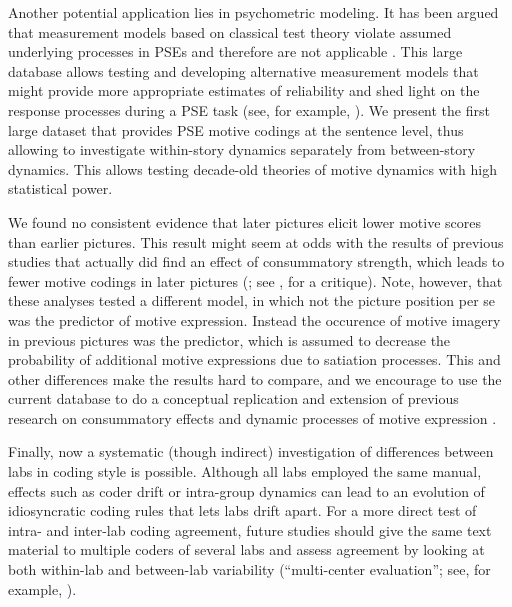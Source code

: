 \documentclass[jou,a4paper]{apa6}\usepackage[]{graphicx}\usepackage[]{color}
\begin{document}
Another potential application lies in psychometric modeling. It has been argued that measurement models based on classical test theory violate assumed underlying processes in PSEs and therefore are not applicable \parencite{atkinson_studying_1981,hibbard_critique_2003,schultheiss_reliability_2008}. This large database allows testing and developing alternative measurement models that might provide more appropriate estimates of reliability and shed light on the response processes during a PSE task (see, for example, ). We present the first large dataset that provides PSE motive codings at the sentence level, thus allowing to investigate within-story dynamics separately from between-story dynamics. This allows testing decade-old theories of motive dynamics with high statistical power. 

We found no consistent evidence that later pictures elicit lower motive scores than earlier pictures. This result might seem at odds with the results of previous studies that actually did find an effect of consummatory strength, which leads to fewer motive codings in later pictures (; see , for a critique). Note, however, that these analyses tested a different model, in which not the picture position per se was the predictor of motive expression. Instead the occurence of motive imagery in previous pictures was the predictor, which is assumed to decrease the probability of additional motive expressions due to satiation processes. This and other differences make the results hard to compare, and we encourage to use the current database to do a conceptual replication and extension of previous research on consummatory effects and dynamic processes of motive expression \parencite{atkinson_dynamics_1970}.

Finally, now a systematic (though indirect) investigation of differences between labs in coding style is possible. 
Although all labs employed the same manual, effects such as coder drift \parencite{schultheiss_MeasuringImplicitMotives_2007} or intra-group dynamics \parencite{jenkins_HandbookClinicalScoring_2008} can lead to an evolution of idiosyncratic coding rules that lets labs drift apart.
For a more direct test of intra- and inter-lab coding agreement, future studies should give the same text material to multiple coders of several labs and assess agreement by looking at both within-lab and between-lab variability (``multi-center evaluation''; see, for example, ).
\end{document}
